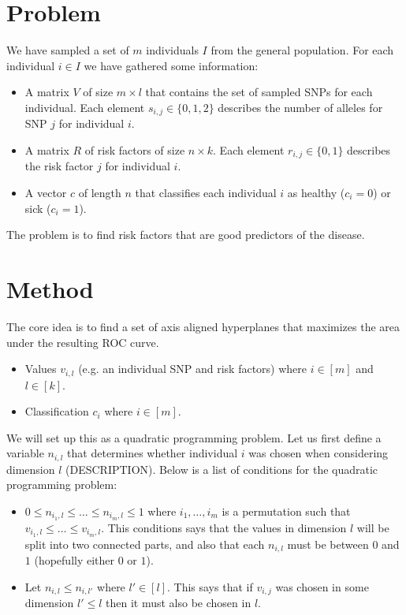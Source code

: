 \documentclass[a4paper]{article}
\begin{document}
\section{Problem}
We have sampled a set of $m$ individuals $I$ from the general population. For each individual $i \in I$ we have gathered some information:
\begin{itemize}
  \item A matrix $V$ of size $m \times l$ that contains the set of sampled SNPs for each individual. Each element $s_{i,j} \in \{0,1,2\}$ describes the number of alleles for SNP $j$ for individual $i$.
  \item A matrix $R$ of risk factors of size $n \times k$. Each element $r_{i,j} \in \{0,1\}$ describes the risk factor $j$ for individual $i$.
  \item A vector $c$ of length $n$ that classifies each individual $i$ as healthy ($c_i = 0$) or sick ($c_i = 1$).
\end{itemize}
The problem is to find risk factors that are good predictors of the disease.

\section{Method}
The core idea is to find a set of axis aligned hyperplanes that maximizes the area under the resulting ROC curve.
\begin{itemize}
  \item Values $v_{i,l}$ (e.g. an individual SNP and risk factors) where $i \in [m]$ and $l \in [k]$.
  \item Classification $c_i$ where $i \in [m]$.
\end{itemize}

We will set up this as a quadratic programming problem. Let us first define a variable $n_{i,l}$ that determines whether individual $i$ was chosen when considering dimension $l$ (DESCRIPTION). Below is a list of conditions for the quadratic programming problem:

\begin{itemize}
  \item $0 \leq n_{i_1,l} \leq \dots \leq n_{i_m,l} \leq 1$ where $i_1, \dots, i_m$ is a permutation such that $v_{i_1,l} \leq \dots \leq v_{i_m,l}$. This conditions says that the values in dimension $l$ will be split into two connected parts, and also that each $n_{i,l}$ must be between $0$ and $1$ (hopefully either $0$ or $1$).
  \item Let $n_{i,l} \leq n_{i,l'}$ where $l' \in [l]$. This says that if $v_{i,j}$ was chosen in some dimension $l' \leq l$ then it must also be chosen in $l$.
\end{itemize}
\end{document}

